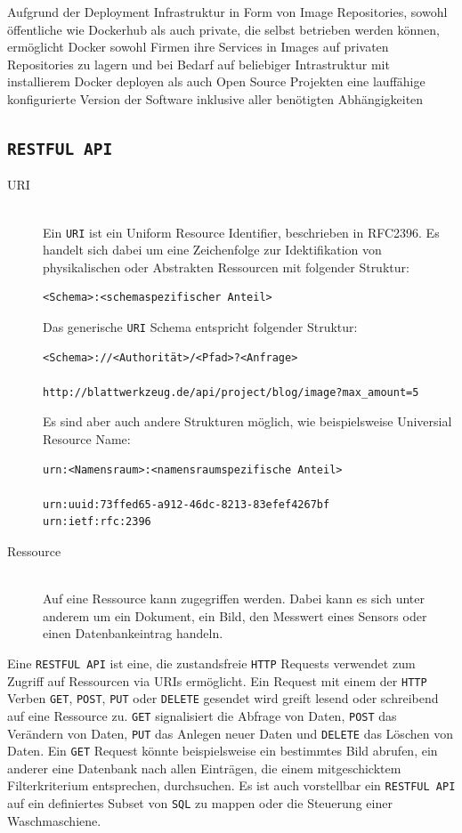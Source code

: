 Aufgrund der Deployment Infrastruktur in Form von Image Repositories, sowohl
öffentliche wie Dockerhub als auch private, die selbst betrieben werden können,
ermöglicht Docker sowohl Firmen ihre Services in Images auf privaten
Repositories zu lagern und bei Bedarf auf beliebiger Intrastruktur mit
installierem Docker deployen als auch Open Source Projekten eine lauffähige
konfigurierte Version der Software inklusive aller benötigten Abhängigkeiten 

\subsection{\texttt{RESTFUL API}}

\begin{description}
\item[URI] \mbox{}\\ Ein \texttt{URI} ist ein Uniform Resource Identifier,
  beschrieben in RFC2396. Es handelt sich dabei um eine Zeichenfolge zur
  Idektifikation von physikalischen oder Abstrakten Ressourcen mit folgender
  Struktur:
\begin{verbatim}
<Schema>:<schemaspezifischer Anteil>
\end{verbatim}
Das generische \texttt{URI} Schema entspricht folgender Struktur:
\begin{verbatim}
<Schema>://<Authorität>/<Pfad>?<Anfrage>

http://blattwerkzeug.de/api/project/blog/image?max_amount=5
\end{verbatim}
Es sind aber auch andere Strukturen möglich, wie beispielsweise Universial
Resource Name:
\begin{verbatim}
urn:<Namensraum>:<namensraumspezifische Anteil>

urn:uuid:73ffed65-a912-46dc-8213-83efef4267bf
urn:ietf:rfc:2396
\end{verbatim}
\item[Ressource] \mbox{}\\ Auf eine Ressource kann zugegriffen werden. Dabei
  kann es sich unter anderem um ein Dokument, ein Bild, den Messwert eines
  Sensors oder einen Datenbankeintrag handeln.
\end{description}

Eine \texttt{RESTFUL API} ist eine, die zustandsfreie \texttt{HTTP} Requests
verwendet zum Zugriff auf Ressourcen via URIs ermöglicht. Ein Request mit
einem der \texttt{HTTP} Verben \texttt{GET}, \texttt{POST}, \texttt{PUT} oder
\texttt{DELETE} gesendet wird greift lesend oder schreibend auf eine Ressource
zu. \texttt{GET} signalisiert die Abfrage von Daten, \texttt{POST} das Verändern
von Daten, \texttt{PUT} das Anlegen neuer Daten und \texttt{DELETE} das Löschen
von Daten. Ein \texttt{GET} Request könnte beispielsweise ein bestimmtes Bild
abrufen, ein anderer eine Datenbank nach allen Einträgen, die einem
mitgeschicktem Filterkriterium entsprechen, durchsuchen. Es ist auch vorstellbar
ein \texttt{RESTFUL API} auf ein definiertes Subset von \texttt{SQL} zu mappen
oder die Steuerung einer Waschmaschiene.

